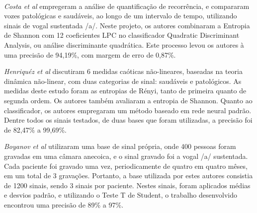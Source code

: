 \documentclass[a4paper,12pt,oneside]{report}
\begin{document}
\\
\par \emph{Costa et al\cite{wca_costa}} empregeram a an\'{a}lise de quantifica\c{c}\~{a}o de recorrência, e compararam vozes patol\'{o}gicas e saud\'{a}veis, ao longo de um intervalo de tempo, utilizando sinais de vogal sustentada /a/. Neste projeto, os autores combinaram a Entropia de Shannon com 12 coeficientes LPC no classificador Quadratic Discriminant Analysis, ou an\'{a}lise discriminante quadr\'{a}tica. Este processo levou os autores \`{a} uma precis\~{a}o de 94,19\%, com margem de erro de 0,87\%. 
\\
\par \emph{Henriqu\'{e}z et al\cite{henriquez}} discutiram 6 medidas ca\'{o}ticas n\~{a}o-lineares, baseadas na teoria din\^{a}mica n\~{a}o-linear,  com duas categorias de sinal: saud\'{a}veis e patol\'{o}gicos. As medidas deste estudo foram as entropias de R\'{e}nyi, tanto de primeira quanto de segunda ordem. Os autores tamb\'{e}m avaliaram a entropia de Shannon. Quanto ao classificador, os autores empregaram um m\'{e}todo baseado em rede neural padr\~{a}o. Dentre todos os sinais testados, de duas bases que foram utilizadas, a precis\~{a}o foi de 82,47\% a 99,69\%. 
\\
\par \emph {Boyanov et al\cite{boyanov}} utilizaram uma base de sinal pr\'{o}pria, onde 400 pessoas foram gravadas em uma c\^{a}mara anecoica, e o sinal gravado foi a vogal /a/ sustentada. Cada paciente foi gravado uma vez, periodicamente de quatro em quatro mêses, em um total de 3 grava\c{c}\~{o}es. Portanto, a base utilizada por estes autores consistia de 1200 sinais, sendo 3 sinais por paciente. Nestes sinais, foram aplicados m\'{e}dias e desvios padr\~{a}o, e utilizando o Teste T de Student, o trabalho desenvolvido encontrou uma precis\~{a}o de 89\% a 97\%. \\
\end{document}
